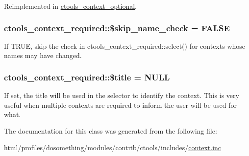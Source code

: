 Reimplemented in \hyperlink{classctools__context__optional_ad0c01a0afda900501e6679ce51408737}{ctools\_\-context\_\-optional}.\hypertarget{classctools__context__required_aa0e1bade9610c1ab52df3ac440e82e22}{
\subsubsection[{\$skip\_\-name\_\-check}]{\setlength{\rightskip}{0pt plus 5cm}ctools\_\-context\_\-required::\$skip\_\-name\_\-check = FALSE}}
\label{classctools__context__required_aa0e1bade9610c1ab52df3ac440e82e22}
If TRUE, skip the check in ctools\_\-context\_\-required::select() for contexts whose names may have changed. \hypertarget{classctools__context__required_a914ddf3d2e10cca70703d3c879c5d225}{
\subsubsection[{\$title}]{\setlength{\rightskip}{0pt plus 5cm}ctools\_\-context\_\-required::\$title = NULL}}
\label{classctools__context__required_a914ddf3d2e10cca70703d3c879c5d225}
If set, the title will be used in the selector to identify the context. This is very useful when multiple contexts are required to inform the user will be used for what. 

The documentation for this class was generated from the following file:\begin{DoxyCompactItemize}
\item 
html/profiles/dosomething/modules/contrib/ctools/includes/\hyperlink{context_8inc}{context.inc}\end{DoxyCompactItemize}
